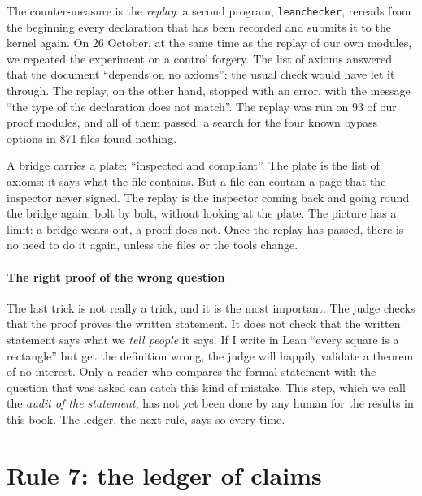 The counter-measure is the \emph{replay}: a second program, \texttt{leanchecker}, rereads from the beginning every
declaration that has been recorded and submits it to the kernel again. On 26 October, at the same time as the replay of
our own modules, we repeated the experiment on a control forgery. The list of axioms answered that the document
``depends on no axioms'': the usual check would have let it through. The replay, on the other hand, stopped with an
error, with the message ``the type of the declaration does not match''. The replay was run on 93 of our proof
modules, and all of them passed; a search for the four known bypass options in 871 files found nothing.

\begin{analogie}
A bridge carries a plate: ``inspected and compliant''. The plate is the list of axioms: it says what the file
contains. But a file can contain a page that the inspector never signed. The replay is the inspector coming back and
going round the bridge again, bolt by bolt, without looking at the plate. The picture has a limit: a bridge wears out,
a proof does not. Once the replay has passed, there is no need to do it again, unless the files or the tools change.
\end{analogie}

\paragraph{The right proof of the wrong question} The last trick is not really a trick, and it is the most important.
The judge checks that the proof proves the written statement. It does not check that the written statement says what
we \emph{tell people} it says. If I write in Lean ``every square is a rectangle'' but get the definition wrong, the
judge will happily validate a theorem of no interest. Only a reader who compares the formal statement with the
question that was asked can catch this kind of mistake. This step, which we call the \emph{audit of the statement},
has not yet been done by any human for the results in this book. The ledger, the next rule, says so every time.

\section{Rule 7: the ledger of claims}

